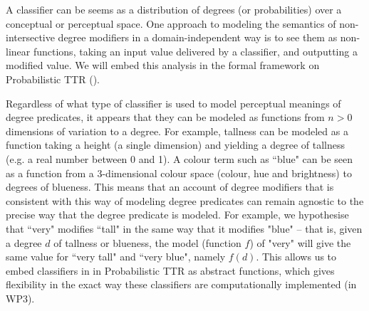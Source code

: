 \documentclass[11pt,a4paper]{article}
\begin{document}
A classifier can be seems as a distribution of degrees (or probabilities) over a conceptual or perceptual space. One approach to modeling the semantics of non-intersective degree modifiers in a domain-independent way is to see them as non-linear functions, taking an input value delivered by a classifier, and outputting a modified value.  We will embed this analysis in the formal framework on Probabilistic TTR ().

Regardless of what type of classifier is used to model perceptual meanings of degree predicates, it appears that they can be modeled as functions from $n>0$ dimensions of variation to a degree. For example, tallness can be modeled as a function taking a height (a single dimension) and yielding a degree of tallness (e.g. a real number between 0 and 1). A colour term such as ``blue" can be seen as a function from a 3-dimensional colour space (colour, hue and brightness) to degrees of blueness. This means that an account of degree modifiers that is consistent with this way of modeling degree predicates can remain agnostic to the precise way that the degree predicate is modeled. For example, we hypothesise that ``very" modifies ``tall" in the same way that it modifies "blue" -- that is, given a degree $d$ of tallness or blueness, the model (function $f$) of "very" will give the same value for ``very tall" and ``very blue", namely $f(d)$. This allows us to embed classifiers in in Probabilistic TTR as abstract functions, which gives flexibility in the exact way these classifiers are computationally implemented (in WP3). 


 









\end{document}
